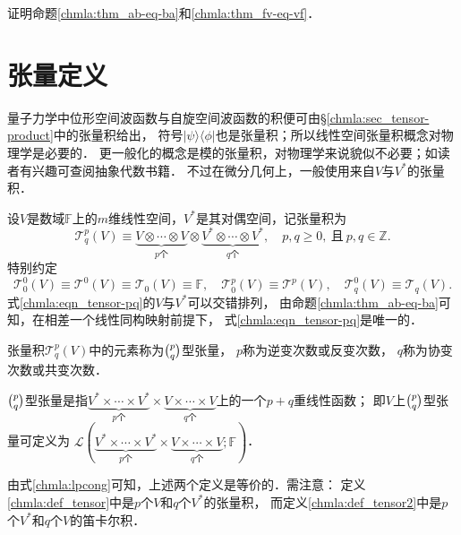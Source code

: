 \begin{exercise}
	证明命题\ref{chmla:thm_ab-eq-ba}和\ref{chmla:thm_fv-eq-vf}．
\end{exercise}


\section{张量定义}\label{chmla:sec_tensor}

量子力学中位形空间波函数与自旋空间波函数的{\kaishu 积}便可由\S\ref{chmla:sec_tensor-product}中的张量积给出，
符号$|\psi \rangle \langle \phi |$也是张量积；所以线性空间张量积概念对物理学是必要的．
更一般化的概念是模的张量积，对物理学来说貌似不必要；如读者有兴趣可查阅抽象代数书籍．
不过在微分几何上，一般使用来自$V$与$V^*$的张量积．

设$V$是数域$\mathbb{F}$上的$m$维线性空间，$V^*$是其对偶空间，记张量积为
\begin{equation}\label{chmla:eqn_tensor-pq}
    \mathcal{T}^p_q(V) \equiv \underbrace{V\otimes \cdots \otimes V}_{p\text{个}}
    \otimes \underbrace{V^*\otimes \cdots \otimes V^*}_{q\text{个}},
    \quad p,q \geqslant 0 , 
    \  {\text{且}} \  p,q \in \mathbb{Z} .
\end{equation}
特别约定
\begin{equation}
    \mathcal{T}^0_0(V) \equiv \mathcal{T}^0(V) \equiv \mathcal{T}_0(V) \equiv \mathbb{F},
    \quad \mathcal{T}^p_0(V) \equiv \mathcal{T}^p(V),
    \quad \mathcal{T}^0_q(V) \equiv \mathcal{T}_q(V).
\end{equation}
式\eqref{chmla:eqn_tensor-pq}的$V$与$V^*$可以交错排列，
由命题\ref{chmla:thm_ab-eq-ba}可知，在相差一个线性同构映射前提下，
式\eqref{chmla:eqn_tensor-pq}是唯一的．


\begin{definition}\label{chmla:def_tensor}
    张量积$\mathcal{T}^p_q(V)$中的元素称为$\binom{p}{q}${\heiti 型张量}，
    $p$称为{\heiti 逆变次数}或反变次数，
    $q$称为{\heiti 协变次数}或共变次数．
\end{definition}

\begin{definition}\label{chmla:def_tensor2}
    $\binom{p}{q}${\heiti 型张量}是指$\underbrace{V^* \times \cdots \times V^*}_{p\text{个}}
    \times \underbrace{V\times \cdots \times V}_{q\text{个}}$上的一个$p+q$重线性函数；
    即$V$上$\binom{p}{q}$型张量可定义为
    $\mathscr{L}(\underbrace{V^* \times \cdots \times V^*}_{p\text{个}}
    \times \underbrace{V\times \cdots \times V}_{q\text{个}};\mathbb{F})$．
\end{definition}
由式\eqref{chmla:lpcong}可知，上述两个定义是等价的．需注意：
定义\ref{chmla:def_tensor}中是$p$个$V$和$q$个$V^*$的张量积，
而定义\ref{chmla:def_tensor2}中是$p$个$V^*$和$q$个$V$的笛卡尔积．

